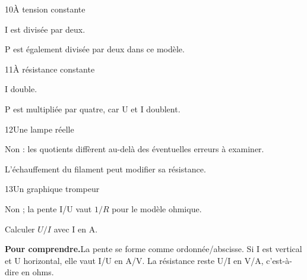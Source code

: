 \par\noindent\begin{minipage}{\linewidth}
\begin{corrige}{10}{À tension constante}
\begin{questions}
\item I est divisée par deux.
\item P est également divisée par deux dans ce modèle.
\end{questions}
\end{corrige}
\end{minipage}
\par\noindent\begin{minipage}{\linewidth}
\begin{corrige}{11}{À résistance constante}
\begin{questions}
\item I double.
\item P est multipliée par quatre, car U et I doublent.
\end{questions}
\end{corrige}
\end{minipage}
\par\noindent\begin{minipage}{\linewidth}
\begin{corrige}{12}{Une lampe réelle}
\begin{questions}
\item Non : les quotients diffèrent au-delà des éventuelles erreurs à examiner.
\item L’échauffement du filament peut modifier sa résistance.
\end{questions}
\end{corrige}
\end{minipage}
\par\noindent\begin{minipage}{\linewidth}
\begin{corrige}{13}{Un graphique trompeur}
\begin{questions}
\item Non ; la pente I/U vaut $1/R$ pour le modèle ohmique.
\item Calculer $U/I$ avec I en A.
\end{questions}
\par\smallskip\noindent\textbf{Pour comprendre.}\enspace La pente se forme comme ordonnée/abscisse. Si I est vertical et U horizontal, elle vaut I/U en A/V. La résistance reste U/I en V/A, c’est-à-dire en ohms.\par
{}
\end{corrige}
\end{minipage}
